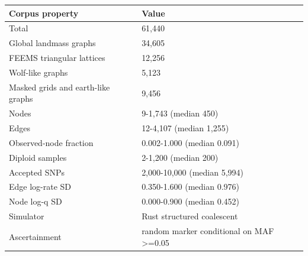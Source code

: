 \begin{tabular}{ll}
\toprule
Corpus property & Value \\
\midrule
Total & 61,440 \\
Global landmass graphs & 34,605 \\
FEEMS triangular lattices & 12,256 \\
Wolf-like graphs & 5,123 \\
Masked grids and earth-like graphs & 9,456 \\
Nodes & 9-1,743 (median 450) \\
Edges & 12-4,107 (median 1,255) \\
Observed-node fraction & 0.002-1.000 (median 0.091) \\
Diploid samples & 2-1,200 (median 200) \\
Accepted SNPs & 2,000-10,000 (median 5,994) \\
Edge log-rate SD & 0.350-1.600 (median 0.976) \\
Node log-q SD & 0.000-0.900 (median 0.452) \\
Simulator & Rust structured coalescent \\
Ascertainment & random marker conditional on MAF >=0.05 \\
\bottomrule
\end{tabular}

